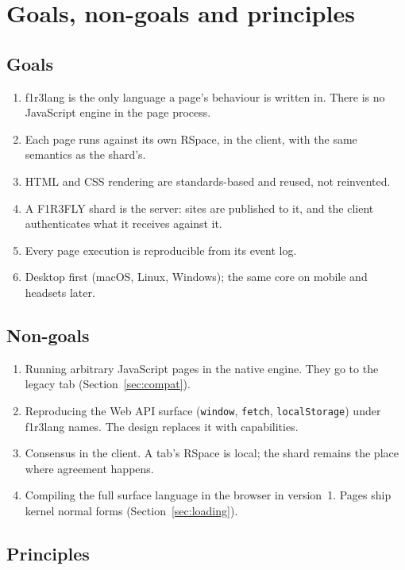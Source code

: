 \documentclass[11pt]{article}
\theoremstyle{definition}
\theoremstyle{remark}
\newcommand{\fl}{f1r3lang}
\newcommand{\code}[1]{\texttt{#1}}
\begin{document}
\section{Goals, non-goals and principles}\label{sec:goals}

\subsection{Goals}
\begin{enumerate}[nosep]
\item \fl{} is the only language a page's behaviour is written in. There is no
  JavaScript engine in the page process.
\item Each page runs against its own RSpace, in the client, with the same semantics
  as the shard's.
\item HTML and CSS rendering are standards-based and reused, not reinvented.
\item A F1R3FLY shard is the server: sites are published to it, and the client authenticates what it receives against it.
\item Every page execution is reproducible from its event log.
\item Desktop first (macOS, Linux, Windows); the same core on mobile and headsets
  later.
\end{enumerate}

\subsection{Non-goals}
\begin{enumerate}[nosep]
\item Running arbitrary JavaScript pages in the native engine. They go to the legacy
  tab (Section~\ref{sec:compat}).
\item Reproducing the Web API surface (\code{window}, \code{fetch}, \code{localStorage})
  under \fl{} names. The design replaces it with capabilities.
\item Consensus in the client. A tab's RSpace is local; the shard remains the place
  where agreement happens.
\item Compiling the full surface language in the browser in version~1. Pages ship
  kernel normal forms (Section~\ref{sec:loading}).
\end{enumerate}

\subsection{Principles}
\end{document}
